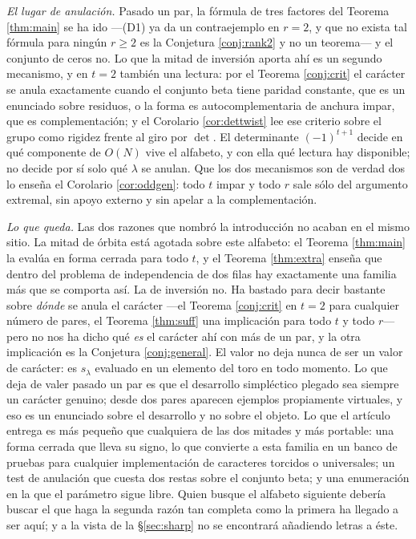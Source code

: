 \documentclass[11pt,reqno]{amsart}
\theoremstyle{plain}
\theoremstyle{definition}
\begin{document}
\emph{El lugar de anulación.} Pasado un par, la fórmula de tres factores del Teorema \ref{thm:main} se ha
ido ---(D1) ya da un contraejemplo en $r=2$, y que no exista tal fórmula para ningún $r\ge2$ es la
Conjetura \ref{conj:rank2} y no un teorema--- y el conjunto de ceros no. Lo que la mitad de inversión aporta ahí es un segundo
mecanismo, y en $t=2$ también una lectura: por el Teorema \ref{conj:crit} el carácter se anula exactamente cuando el
conjunto beta tiene paridad constante, que es un enunciado sobre residuos, o la forma es
autocomplementaria de anchura impar, que es complementación; y el Corolario \ref{cor:dettwist} lee ese criterio sobre el grupo
como rigidez frente al giro por $\det$. El determinante $(-1)^{t+1}$ decide en qué componente de
$O(N)$ vive el alfabeto, y con ella qué lectura hay disponible; no decide por sí solo qué $\lambda$
se anulan. Que los dos mecanismos son de verdad dos lo enseña el Corolario \ref{cor:oddgen}: todo
$t$ impar y todo $r$ sale sólo del argumento extremal, sin apoyo externo y sin apelar a la
complementación.

\emph{Lo que queda.} Las dos razones que nombró la introducción no acaban en el mismo sitio. La
mitad de órbita está agotada sobre este alfabeto: el Teorema \ref{thm:main} la evalúa en forma
cerrada para todo $t$, y
el Teorema \ref{thm:extra} enseña que dentro del problema de independencia de dos filas hay
exactamente una familia más que se comporta así. La de inversión no. Ha bastado para decir bastante
sobre \emph{dónde} se anula el carácter ---el Teorema \ref{conj:crit} en $t=2$ para cualquier número
de pares, el Teorema \ref{thm:suff} una implicación para todo $t$ y todo $r$--- pero no nos ha dicho
qué \emph{es} el carácter ahí con más de un par, y la otra implicación es la Conjetura
\ref{conj:general}. El valor no deja nunca de ser un valor de carácter: es $s_\lambda$ evaluado en
un elemento del toro en todo momento. Lo que deja de valer pasado un par es que el desarrollo
simpléctico plegado sea siempre un carácter genuino; desde dos pares aparecen ejemplos propiamente
virtuales, y eso es un enunciado sobre el desarrollo y no sobre el objeto. Lo que el artículo entrega
es más pequeño que cualquiera de las dos mitades y más portable: una forma cerrada que lleva su
signo, lo que convierte a esta familia en un banco de pruebas para cualquier implementación de
caracteres torcidos o universales; un test de anulación que cuesta dos restas sobre el conjunto beta;
y una enumeración en la que el parámetro sigue libre. Quien busque el alfabeto siguiente debería
buscar el que haga la segunda razón tan completa como la primera ha llegado a ser aquí; y a la vista
de la \S\ref{sec:sharp} no se encontrará añadiendo letras a éste.
\end{document}
